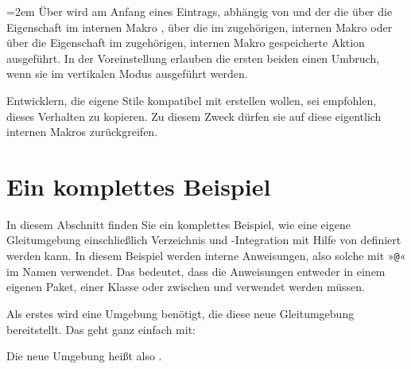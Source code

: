 \begingroup
\emergencystretch=2em
Über  wird am Anfang eines
Eintrags, abhängig von  und der  die
über die Eigenschaft  im internen Makro
, über die
 im zugehörigen, internen
Makro\iffree{
}{\linebreak} oder
über die Eigenschaft  im zugehörigen, internen
Makro  gespeicherte
Aktion ausgeführt. In der Voreinstellung erlauben die
ersten beiden einen Umbruch, wenn sie im vertikalen Modus ausgeführt
werden.\par
\endgroup

Entwicklern, die eigene Stile kompatibel mit  erstellen
wollen, sei empfohlen, dieses Verhalten zu kopieren. Zu diesem Zweck dürfen
sie auf diese eigentlich internen Makros zurückgreifen.%
\EndIndexGroup


\section{Ein komplettes Beispiel}

In diesem Abschnitt finden Sie ein komplettes Beispiel, wie eine eigene
Gleitumgebung einschließlich Verzeichnis und \KOMAScript-Integration mit Hilfe
von  definiert werden kann. In diesem Beispiel werden
interne Anweisungen, also solche mit »\texttt{@}« im Namen
verwendet. Das  bedeutet, dass die Anweisungen entweder in
einem eigenen Paket, einer Klasse oder zwischen
%
 und 
verwendet werden müssen.

Als erstes wird eine Umgebung benötigt, die diese neue
Gleitumgebung bereitstellt. Das geht ganz einfach mit:
\begin{lstcode}
  \newenvironment{remarkbox}%
    {\@float{remarkbox}}%
    {\end@float}
\end{lstcode}
Die neue Umgebung heißt also . 

